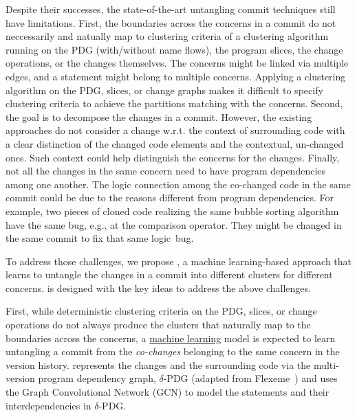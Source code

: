 

Despite their successes, the state-of-the-art untangling commit
techniques still have limitations. First, the boundaries across the
concerns in a commit do not neccessarily and natually map to
clustering criteria of a clustering algorithm running on the PDG
(with/without name flows), the program slices, the change operations,
or the changes themselves. The concerns might be linked via multiple
edges, and a statement might belong to multiple concerns. Applying a
clustering algorithm on the PDG, slices, or change graphs makes it difficult
to specify clustering criteria to achieve the partitions matching with
the concerns.
%
Second, the goal is to decompose the changes in a commit. However, the
existing approaches do not consider a change w.r.t. the context of
surrounding code with a clear distinction of the changed code elements
and the contextual, un-changed ones. Such context could help
distinguish the concerns for the changes. Finally, not all the changes
in the same concern need to have program dependencies among one
another. The logic connection among the co-changed code in the same
commit could be due to the reasons different from program
dependencies. For example, two pieces of cloned code realizing the
same bubble sorting algorithm have the same bug, e.g., at the
comparison operator. They might be changed in the same commit to fix
that same logic~bug.

To address those challenges, we propose {\tool}, a machine
learning-based approach that learns to untangle the changes in a
commit into different clusters for different concerns. {\tool} is
designed with the key ideas to address the above challenges.

First, while deterministic clustering criteria on the PDG, slices, or
change operations do not always produce the clusters that naturally
map to the boundaries across the concerns, a \underline{machine
  learning} model is expected to learn untangling a commit from the
{\em co-changes} belonging to the same concern in the version history.
%
{\tool} represents the changes and the surrounding code via the
multi-version program dependency graph, $\delta$-PDG (adapted from
Flexeme~\cite{flexeme-fse20}) and uses the Graph Convolutional Network
(GCN) to model the statements and their interdependencies in
$\delta$-PDG.


